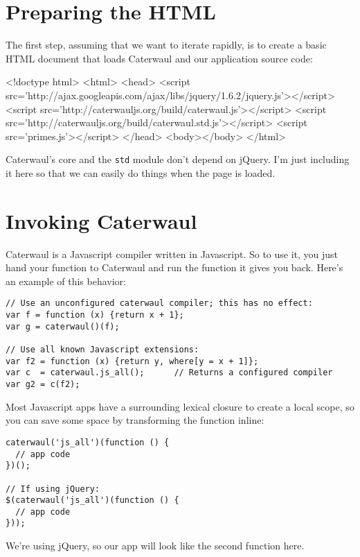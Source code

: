 \documentclass{report}
\begin{document}
\section{Preparing the HTML}
    The first step, assuming that we want to iterate rapidly, is to create a basic HTML document that loads Caterwaul and our application source code:

\begin{resourcecode}
<!doctype html>
<html>
  <head>
  <script src='http://ajax.googleapis.com/ajax/libs/jquery/1.6.2/jquery.js'></script>
  <script src='http://caterwauljs.org/build/caterwaul.js'></script>
  <script src='http://caterwauljs.org/build/caterwaul.std.js'></script>
  <script src='primes.js'></script>
  </head>
  <body></body>
</html> \end{resourcecode}

    Caterwaul's core and the {\tt std} module don't depend on jQuery. I'm just including it here so that we can easily do things when the page is loaded.

\section{Invoking Caterwaul}
    Caterwaul is a Javascript compiler written in Javascript. So to use it, you just hand your function to Caterwaul and run the function it gives you back. Here's an example of this behavior:

\begin{verbatim}
// Use an unconfigured caterwaul compiler; this has no effect:
var f = function (x) {return x + 1};
var g = caterwaul()(f);

// Use all known Javascript extensions:
var f2 = function (x) {return y, where[y = x + 1]};
var c  = caterwaul.js_all();      // Returns a configured compiler
var g2 = c(f2);
\end{verbatim}

    Most Javascript apps have a surrounding lexical closure to create a local scope, so you can save some space by transforming the function inline:

\begin{verbatim}
caterwaul('js_all')(function () {
  // app code
})();

// If using jQuery:
$(caterwaul('js_all')(function () {
  // app code
}));
\end{verbatim}

    We're using jQuery, so our app will look like the second function here.
\end{document}
